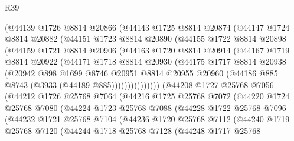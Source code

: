 \begin{lexlean}{R39}
\begin{coremodule}
          (@44139
            @1726
            @8814
            @20866
            (@44143
              @1725
              @8814
              @20874
              (@44147
                @1724
                @8814
                @20882
                (@44151
                  @1723
                  @8814
                  @20890
                  (@44155
                    @1722
                    @8814
                    @20898
                    (@44159
                      @1721
                      @8814
                      @20906
                      (@44163
                        @1720
                        @8814
                        @20914
                        (@44167
                          @1719
                          @8814
                          @20922
                          (@44171
                            @1718
                            @8814
                            @20930
                            (@44175
                              @1717
                              @8814
                              @20938
                              (@20942
                                @898
                                @1699
                                @8746
                                @20951
                                @8814
                                @20955
                                @20960
                                (@44186 @885 @8743 (@3933 (@44189 @885)))))))))))))))
        (@44208
          @1727
          @25768
          @7056
          (@44212
            @1726
            @25768
            @7064
            (@44216
              @1725
              @25768
              @7072
              (@44220
                @1724
                @25768
                @7080
                (@44224
                  @1723
                  @25768
                  @7088
                  (@44228
                    @1722
                    @25768
                    @7096
                    (@44232
                      @1721
                      @25768
                      @7104
                      (@44236
                        @1720
                        @25768
                        @7112
                        (@44240
                          @1719
                          @25768
                          @7120
                          (@44244
                            @1718
                            @25768
                            @7128
                            (@44248
                              @1717
                              @25768

\end{coremodule}
\end{lexlean}
